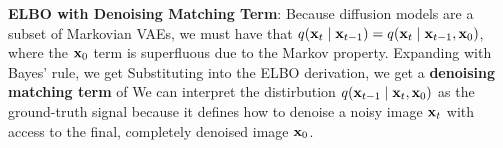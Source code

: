 \documentclass{article}
\begin{document}
  \textbf{ELBO with Denoising Matching Term}: Because diffusion models are a subset of Markovian VAEs, we must have that $q(\mathbf{x}_t\mid \mathbf{x}_{t-1})=q(\mathbf{x}_t\mid\mathbf{x}_{t-1},\mathbf{x}_0)$, where the $\mathbf{x}_0$ term is superfluous due to the Markov property. Expanding with Bayes' rule, we get 
  Substituting into the ELBO derivation, we get a \textbf{denoising matching term} of
  We can interpret the distirbution $q(\mathbf{x}_{t-1}\mid\mathbf{x}_t,\mathbf{x}_0)$ as the ground-truth signal because it defines how to denoise a noisy image $\mathbf{x}_t$ with access to the final, completely denoised image $\mathbf{x}_0$.
\end{document}
